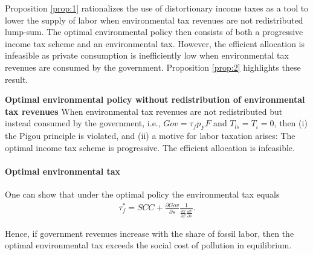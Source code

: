 
Proposition \ref{prop:1} rationalizes the use of distortionary income taxes as a tool to lower the supply of labor when environmental tax revenues are not redistributed lump-sum. 
The optimal environmental policy then consists of both a progressive income tax scheme and an environmental tax. However, the efficient allocation is infeasible as private consumption is inefficiently low when environmental tax revenues are consumed by the government. Proposition \ref{prop:2} highlights these result.

\begin{prop}\label{prop:2}\textbf{Optimal environmental policy without redistribution of environmental tax revenues}
When environmental tax revenues are not redistributed but instead consumed by the government, i.e., $Gov=\tau_fp_FF$ and $T_{ls}=T_\iota=0$, then (i) the Pigou principle is violated, and (ii) a motive for labor taxation arises: The optimal income tax scheme is progressive. %
The efficient allocation is infeasible.  
\end{prop}

\paragraph{Optimal environmental tax}
One can show that under the optimal policy the environmental tax equals
	\begin{align}
\tau_{f}^*= SCC+\frac{\partial Gov}{\partial s}\frac{1}{\frac{\partial Y}{\partial F}\frac{\partial F}{\partial s}}.
\end{align}
\begin{comment}
content...

This can be further simplified:
\begin{align}
\tau_f^* = 1-\frac{SCC}{\frp{w}{s}}w. 
\end{align}
A condition for $\tau_f$ to exceed the social cost of the externality reads
\begin{align}
SCC<\frac{1}{1+\frac{w}{\frp{w}{s}}}
\end{align}
\end{comment}
Hence, if government revenues increase with the share of fossil labor, then the optimal environmental tax exceeds the social cost of pollution in equilibrium. 	

